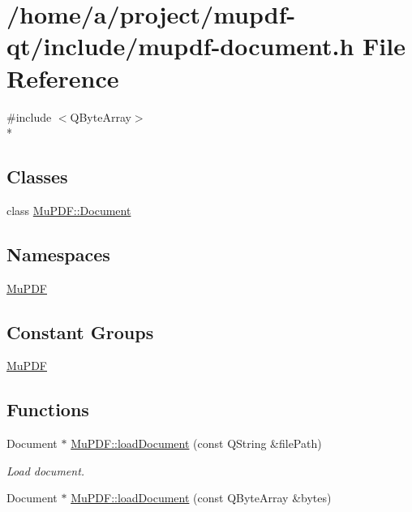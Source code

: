 \hypertarget{mupdf-document_8h}{\section{/home/a/project/mupdf-\/qt/include/mupdf-\/document.h File Reference}
\label{mupdf-document_8h}
}
{\ttfamily \#include $<$Q\-Byte\-Array$>$}\\*
\subsection*{Classes}
\begin{DoxyCompactItemize}
\item 
class \hyperlink{class_mu_p_d_f_1_1_document}{Mu\-P\-D\-F\-::\-Document}
\end{DoxyCompactItemize}
\subsection*{Namespaces}
\begin{DoxyCompactItemize}
\item 
\hyperlink{namespace_mu_p_d_f}{Mu\-P\-D\-F}
\end{DoxyCompactItemize}
\subsection*{Constant Groups}
\begin{DoxyCompactItemize}
\item 
\hyperlink{namespace_mu_p_d_f}{Mu\-P\-D\-F}
\end{DoxyCompactItemize}
\subsection*{Functions}
\begin{DoxyCompactItemize}
\item 
Document $\ast$ \hyperlink{namespace_mu_p_d_f_a5cf746094bc9648aca0d4a83e3ac44b3}{Mu\-P\-D\-F\-::load\-Document} (const Q\-String \&file\-Path)
\begin{DoxyCompactList}\small\item\em Load document. \end{DoxyCompactList}\item 
Document $\ast$ \hyperlink{namespace_mu_p_d_f_a294a09188a3dcab290679752dfc8d52b}{Mu\-P\-D\-F\-::load\-Document} (const Q\-Byte\-Array \&bytes)
\end{DoxyCompactItemize}
